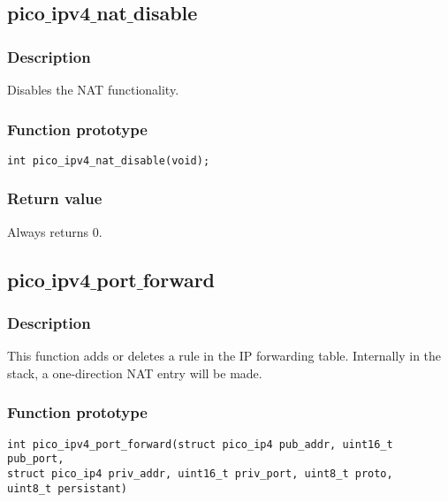 \subsection{pico$\_$ipv4$\_$nat$\_$disable}

\subsubsection*{Description}
Disables the NAT functionality.

\subsubsection*{Function prototype}
\begin{verbatim}
int pico_ipv4_nat_disable(void);
\end{verbatim}


\subsubsection*{Return value}
Always returns 0.



\subsection{pico$\_$ipv4$\_$port$\_$forward}

\subsubsection*{Description}
This function adds or deletes a rule in the IP forwarding table. Internally in the stack,
a one-direction NAT entry will be made.

\subsubsection*{Function prototype}
\begin{verbatim}
int pico_ipv4_port_forward(struct pico_ip4 pub_addr, uint16_t pub_port,
struct pico_ip4 priv_addr, uint16_t priv_port, uint8_t proto,
uint8_t persistant)
\end{verbatim}

